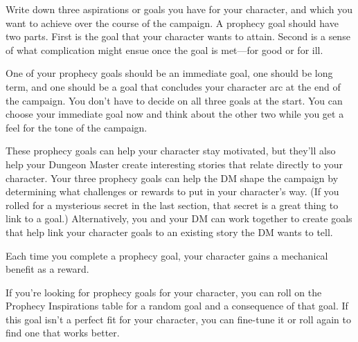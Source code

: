 \documentclass[10pt,a4paper,twoside,bg=print,twocolumn,openany,nodeprecatedcode]{dndbook}
\begin{document}
Write down three aspirations or goals you have for your character, and which you want to achieve over the course of the campaign. A prophecy goal should have two parts. First is the goal that your character wants to attain. Second is a sense of what complication might ensue once the goal is met—for good or for ill.

One of your prophecy goals should be an immediate goal, one should be long term, and one should be a goal that concludes your character arc at the end of the campaign. You don't have to decide on all three goals at the start. You can choose your immediate goal now and think about the other two while you get a feel for the tone of the campaign.

These prophecy goals can help your character stay motivated, but they'll also help your Dungeon Master create interesting stories that relate directly to your character. Your three prophecy goals can help the DM shape the campaign by determining what challenges or rewards to put in your character's way. (If you rolled for a mysterious secret in the last section, that secret is a great thing to link to a goal.) Alternatively, you and your DM can work together to create goals that help link your character goals to an existing story the DM wants to tell.

Each time you complete a prophecy goal, your character gains a mechanical benefit as a reward.

If you're looking for prophecy goals for your character, you can roll on the Prophecy Inspirations table for a random goal and a consequence of that goal. If this goal isn't a perfect fit for your character, you can fine-tune it or roll again to find one that works better.
\end{document}
